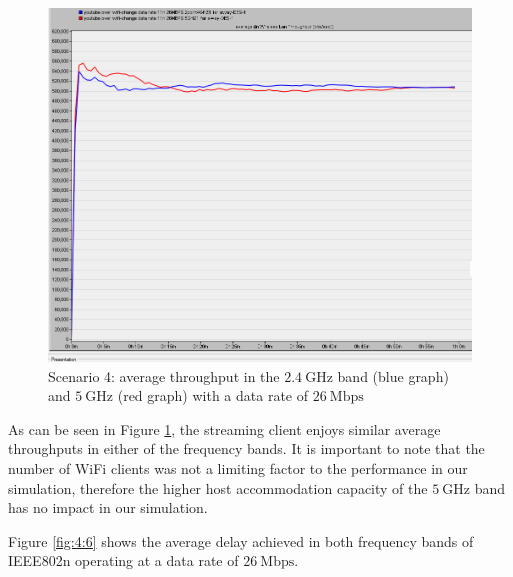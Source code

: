 \begin{figure}[H]
	\centering
	\includegraphics[scale=0.3]{Figures/amantianrenamed/Scenario4AveThroughpuof26Mbps2.4GHzand26Mbps5GHz.png}
	\caption[Scenario 4: average throughput at $26~\mathrm{Mbps}$ in two frequency bands]{Scenario 4: average throughput in the $2.4~\mathrm{GHz}$ band (blue graph) and $5~\mathrm{GHz}$ (red graph) with a data rate of $26~\mathrm{Mbps}$}
	\label{fig:4:5}
\end{figure}

As can be seen in Figure \ref{fig:4:5}, the streaming client enjoys similar average throughputs in either of the frequency bands. It is important to note that the number of \gls{WiFi} clients was not a limiting factor to the performance in our simulation, therefore the higher host accommodation capacity of the $5~\mathrm{GHz}$ band has no impact in our simulation.

Figure \ref{fig:4:6} shows the average delay achieved in both frequency bands of \gls{IEEE802}n operating at a data rate of $26~\mathrm{Mbps}$.

